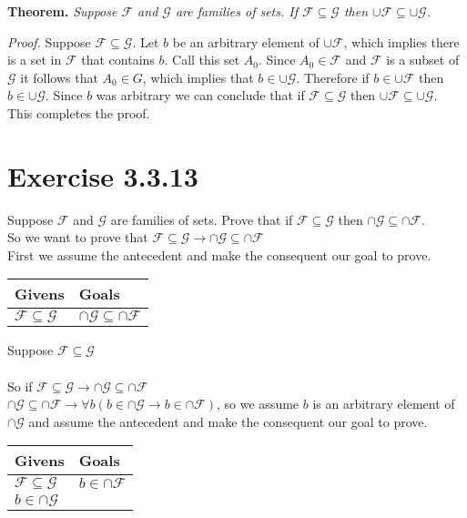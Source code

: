 \documentclass{article}
\newcommand{\n}{ \noindent }
\newcommand{\F}{\mathcal{F}}
\newcommand{\G}{\mathcal{G}}
\begin{document}
\n \textbf{Theorem.} \textit{Suppose $\F$ and $\G$ are families of sets. If $\F \subseteq \G$ then 
$\cup \F \subseteq \cup \G$.}

\n \textit{Proof.} Suppose $\F \subseteq \G$. Let $b$ be an arbitrary element of $\cup \F$, which implies there is a set in $\mathcal{F}$ that contains $b$. Call this set $A_{0}$. Since $A_{0} \in \F$ and $\F$ is a subset of $\G$ it follows that $A_{0} \in G$, which implies that $b \in \cup \G$. Therefore if $b \in \cup \F$ then $b \in \cup \G$. Since $b$ was arbitrary we can conclude that if $\F \subseteq \G$ then $\cup \F \subseteq \cup \G$. This completes the proof.


\section{Exercise 3.3.13}
\n Suppose $\F$ and $\G$ are families of sets. Prove that if $\F \subseteq \G$ then 
$\cap \G \subseteq \cap \F$. \\

\n So we want to prove that 
$\F \subseteq \G \rightarrow \cap \G \subseteq \cap \F$ \\

\n First we assume the antecedent and make the consequent our goal to prove.

\begin{table}[h]
\begin{tabular}{ll}
\hline
Givens & Goals   \\ \hline
$\F \subseteq \G$ & $\cap \G \subseteq \cap \F$   \\ \hline
\end{tabular}
\end{table}

\n Suppose $\F \subseteq \G$ \\
\indent [proof of $\cap \G \subseteq \cap \F$ ] \\
\n So if $\F \subseteq \G \rightarrow \cap \G \subseteq \cap \F$ \\

\n $\cap \G \subseteq \cap \F \rightarrow \forall b ( b \in \cap \G \rightarrow b \in \cap \F)$, so we assume $b$ is an arbitrary element of $\cap \G$ and assume the antecedent and make the consequent our goal to prove. \\

\begin{table}[h]
\begin{tabular}{ll}
\hline
Givens & Goals   \\ \hline
$\F \subseteq \G$ & $b \in \cap \F$   \\
$b \in \cap \G$ & \\ \hline
\end{tabular}
\end{table}
\end{document}
